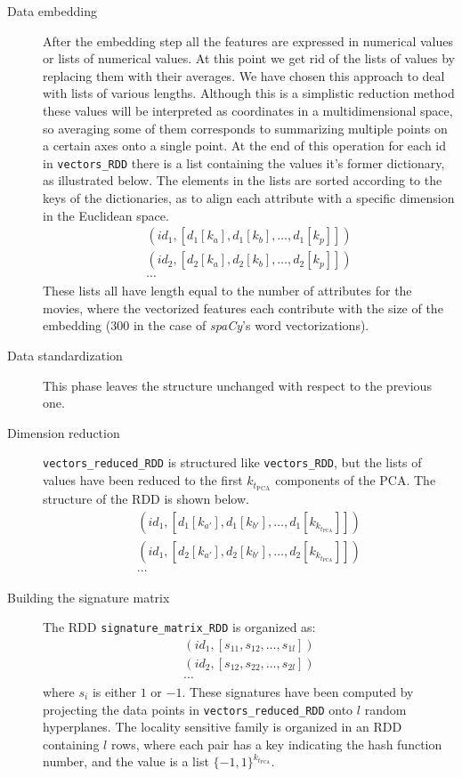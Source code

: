 \begin{description}
    \item [Data embedding] After the embedding step all the features are expressed in numerical values or lists of numerical values. At this point we get rid of the lists of values by replacing them with their averages. We have chosen this approach to deal with lists of various lengths. Although this is a simplistic reduction method these values will be interpreted as coordinates in a multidimensional space, so averaging some of them corresponds to summarizing multiple points on a certain axes onto a single point. At the end of this operation for each id in \texttt{vectors\_RDD} there is a list containing the values it's former dictionary, as illustrated below. The elements in the lists are sorted according to the keys of the dictionaries, as to align each attribute with a specific dimension in the Euclidean space.
        $$\begin{array}{c}
            (id_1, [d_1[k_a], d_1[k_b], \dots, d_1[k_p]])\\
            (id_2, [d_2[k_a], d_2[k_b], \dots, d_2[k_p]])\\
            \cdots
        \end{array}$$
    These lists all have length equal to the number of attributes for the movies, where the vectorized features each contribute with the size of the embedding ($300$ in the case of \textit{spaCy}'s word vectorizations).
    
    \item [Data standardization] This phase leaves the structure unchanged with respect to the previous one.

    \item [Dimension reduction] \texttt{vectors\_reduced\_RDD} is structured like \texttt{vectors\_RDD}, but the lists of values have been reduced to the first $k_{t_\text{PCA}}$ components of the PCA. The structure of the RDD is shown below.
        $$\begin{array}{c}
            (id_1, [d_1[k_{a'}], d_1[k_{b'}], \dots, d_1[k_{k_{t_\text{PCA}}}]])\\
            (id_1, [d_2[k_{a'}], d_2[k_{b'}], \dots, d_2[k_{k_{t_\text{PCA}}}]])\\
            \cdots
        \end{array}$$

    \item [Building the signature matrix] The RDD \texttt{signature\_matrix\_RDD} is organized as:
        $$\begin{array}{c}
            (id_1, [s_{11}, s_{12}, \dots, s_{1l}])\\
            (id_2, [s_{12}, s_{22}, \dots, s_{2l}])\\
            \cdots
        \end{array}$$
    where $s_i$ is either $1$ or $-1$. These signatures have been computed by projecting the data points in \texttt{vectors\_reduced\_RDD} onto $l$ random hyperplanes. The locality sensitive family is organized in an RDD containing $l$ rows, where each pair has a key indicating the hash function number, and the value is a list $\{-1,1\}^{k_{t_\text{PCA}}}$.


\end{description}
